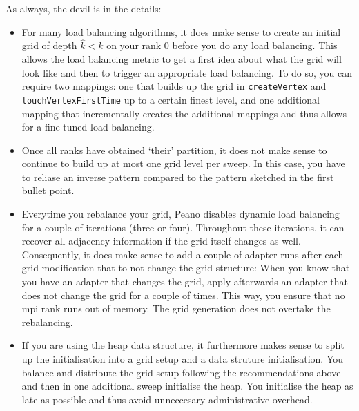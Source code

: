 As always, the devil is in the details:
\begin{itemize}
  \item  For many load balancing algorithms, it does make sense to create an
  initial grid of depth $\hat k <k$ on your rank 0 before you do any load
  balancing. This allows the load balancing metric to get a first idea about
  what the grid will look like and then to trigger an appropriate load
  balancing. To do so, you can require two mappings: one that builds up the grid
  in \texttt{createVertex} and \texttt{touchVertexFirstTime} up to a certain
  finest level, and one additional mapping that incrementally creates the
  additional mappings and thus allows for a fine-tuned load balancing.
  \item Once all ranks have obtained `their' partition, it does not make sense
  to continue to build up at most one grid level per sweep. In this case, you
  have to reliase an inverse pattern compared to the pattern sketched in the
  first bullet point.
  \item Everytime you rebalance your grid, Peano disables dynamic load balancing
  for a couple of iterations (three or four). Throughout these iterations, it
  can recover all adjacency information if the grid itself changes as well.
  Consequently, it does make sense to add a couple of adapter runs after each
  grid modification that to not change the grid structure: When you know that
  you have an adapter that changes the grid, apply afterwards an adapter that
  does not change the grid for a couple of times. This way, you ensure that no
  mpi rank runs out of memory. The grid generation does not overtake the rebalancing.
  \item If you are using the heap data structure, it furthermore makes sense to split up
the initialisation into a grid setup and a data struture initialisation.
You balance and distribute the grid setup following the recommendations above
and then in one additional sweep initialise the heap.
You initialise the heap as late as possible and thus avoid unneccesary
administrative overhead.
\end{itemize}
